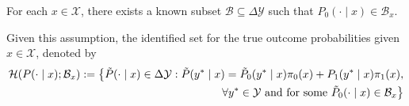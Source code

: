 \begin{assumption}
    For each $x\in \mathcal{X}$, there exists a known subset $\mathcal{B}\subseteq \Delta \mathcal{Y}$ such that $P_0(\cdot\mid x)\in \mathcal{B}_x$.
\end{assumption}
Given this assumption, the identified set for the true outcome probabilities given $x\in \mathcal{X}$, denoted by
\begin{equation}
    \begin{aligned}
        \mathcal{H}(P(\cdot\mid x);\mathcal{B}_x):=\big\{\tilde{P}(\cdot\mid x)\in\Delta \mathcal{Y}: \tilde{P}(y^*\mid x)=\tilde{P}_0(y^*\mid x)\pi_0(x)+P_1(y^*\mid x)\pi_1(x),\\
        \forall y^*\in \mathcal{Y} \textnormal{ and for some } \tilde{P}_0(\cdot\mid x)\in \mathcal{B}_x\big\}
    \end{aligned}
    \nonumber
\end{equation}




















